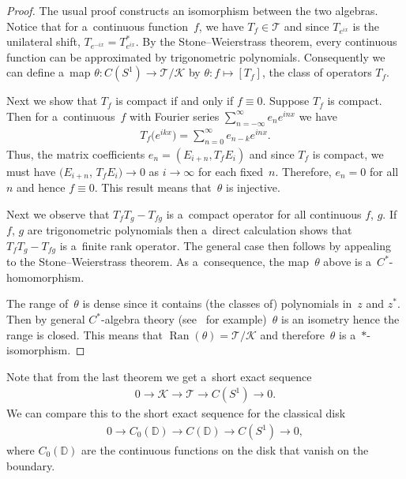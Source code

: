 \documentclass[pdftex]{sigma}
\numberwithin{equation}{section}
\DeclareMathOperator{\Ran}{Ran}
\begin{document}
\begin{proof}
The usual proof constructs an isomorphism between the two algebras.
Notice that for a~continuous function~$f$, we have $T_f\in\mathcal{T}$ and since $T_{e^{ix}}$ is the unilateral shift,
$T_{e^{-ix}}=T_{e^{ix}}^*$.
By the Stone--Weierstrass theorem, every continuous function can be approximated by trigonometric polynomials.
Consequently we can def\/ine a~map $\theta: C(S^1) \to \mathcal{T}/\mathcal{K}$ by $\theta: f \mapsto [T_f]$, the class of
operators $T_f$.

Next we show that $T_f$ is compact if and only if $f\equiv 0$.
Suppose $T_f$ is compact.
Then for a~continuous~$f$ with Fourier series $ \sum\limits_{n=-\infty}^\infty e_n e^{inx}$ we have
\begin{gather*}
T_f\big(e^{ikx}\big)=\sum\limits_{n=0}^\infty e_{n-k}e^{inx}.
\end{gather*}
Thus, the matrix coef\/f\/icients $e_n=(E_{i+n},T_f E_i)$ and since $T_f$ is compact, we must have $(E_{i+n}$,
$T_f E_i)\to0$
as $i\to\infty$ for each f\/ixed~$n$.
Therefore, $e_n=0$ for all~$n$ and hence $f\equiv 0$.
This result means that~$\theta$ is injective.

Next we observe that $T_fT_g-T_{fg}$ is a~compact operator for all continuous $f$, $g$.
If $f$, $g$ are trigonometric polynomials then a~direct calculation shows that $T_fT_g-T_{fg}$ is a~f\/inite rank operator.
The general case then follows by appealing to the Stone--Weierstrass theorem.
As a~consequence, the map~$\theta$ above is a~$C^*$-homomorphism.

The range of~$\theta$ is dense since it contains (the classes of) polynomials in~$z$ and $z^*$.
Then by general $C^*$-algebra theory (see~\cite{Conway} for example)~$\theta$ is an isometry hence the range is closed.
This means that $\Ran(\theta)=\mathcal{T}/\mathcal{K}$ and therefore~$\theta$ is a~$*$-isomorphism.
\end{proof}

Note that from the last theorem we get a~short exact sequence
\begin{gather*}
0\rightarrow \mathcal{K}\rightarrow\mathcal{T}\rightarrow C(S^1)\rightarrow 0.
\end{gather*}
We can compare this to the short exact sequence for the classical disk
\begin{gather*}
0\rightarrow C_0({\mathbb D})\rightarrow C({\mathbb D})\rightarrow C(S^1)\rightarrow 0,
\end{gather*}
where $C_0({\mathbb D})$ are the continuous functions on the disk that vanish on the boundary.
\end{document}
